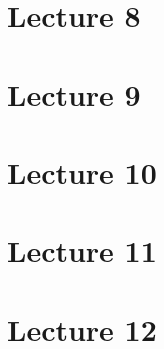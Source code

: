 \documentclass[14pt,twoside,a4paper,fleqn]{article}
\theoremstyle{plain}
\begin{document}
\newpage
\section{Lecture 8}
\section{Lecture 9}
\section{Lecture 10}
\section{Lecture 11}
\section{Lecture 12}
\end{document}
